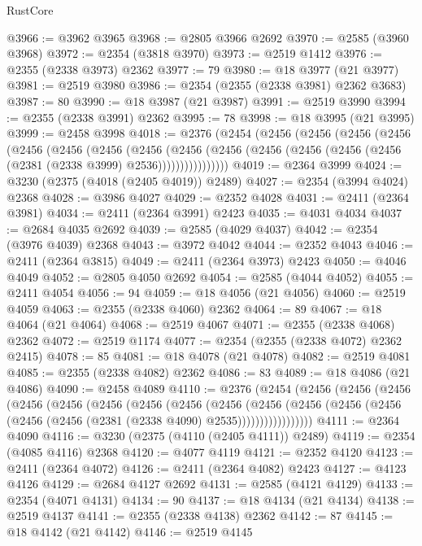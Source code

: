 \begin{lexlean}{RustCore}
\begin{coremodule}
@3966 := @3962 @3965
@3968 := @2805 @3966 @2692
@3970 := @2585 (@3960 @3968)
@3972 := @2354 (@3818 @3970)
@3973 := @2519 @1412
@3976 := @2355 (@2338 @3973) @2362
@3977 := 79
@3980 := @18 @3977 (@21 @3977)
@3981 := @2519 @3980
@3986 := @2354 (@2355 (@2338 @3981) @2362 @3683)
@3987 := 80
@3990 := @18 @3987 (@21 @3987)
@3991 := @2519 @3990
@3994 := @2355 (@2338 @3991) @2362
@3995 := 78
@3998 := @18 @3995 (@21 @3995)
@3999 := @2458 @3998
@4018 := @2376
    (@2454
      (@2456
        (@2456
          (@2456
            (@2456
              (@2456
                (@2456
                  (@2456
                    (@2456
                      (@2456
                        (@2456
                          (@2456 (@2456 (@2456 (@2456 (@2381 (@2338 @3999) @2536))))))))))))))))
@4019 := @2364 @3999
@4024 := @3230 (@2375 (@4018 (@2405 @4019)) @2489)
@4027 := @2354 (@3994 @4024) @2368
@4028 := @3986 @4027
@4029 := @2352 @4028
@4031 := @2411 (@2364 @3981)
@4034 := @2411 (@2364 @3991) @2423
@4035 := @4031 @4034
@4037 := @2684 @4035 @2692
@4039 := @2585 (@4029 @4037)
@4042 := @2354 (@3976 @4039) @2368
@4043 := @3972 @4042
@4044 := @2352 @4043
@4046 := @2411 (@2364 @3815)
@4049 := @2411 (@2364 @3973) @2423
@4050 := @4046 @4049
@4052 := @2805 @4050 @2692
@4054 := @2585 (@4044 @4052)
@4055 := @2411 @4054
@4056 := 94
@4059 := @18 @4056 (@21 @4056)
@4060 := @2519 @4059
@4063 := @2355 (@2338 @4060) @2362
@4064 := 89
@4067 := @18 @4064 (@21 @4064)
@4068 := @2519 @4067
@4071 := @2355 (@2338 @4068) @2362
@4072 := @2519 @1174
@4077 := @2354 (@2355 (@2338 @4072) @2362 @2415)
@4078 := 85
@4081 := @18 @4078 (@21 @4078)
@4082 := @2519 @4081
@4085 := @2355 (@2338 @4082) @2362
@4086 := 83
@4089 := @18 @4086 (@21 @4086)
@4090 := @2458 @4089
@4110 := @2376
    (@2454
      (@2456
        (@2456
          (@2456
            (@2456
              (@2456
                (@2456
                  (@2456
                    (@2456
                      (@2456
                        (@2456
                          (@2456
                            (@2456 (@2456 (@2456 (@2456 (@2381 (@2338 @4090) @2535)))))))))))))))))
@4111 := @2364 @4090
@4116 := @3230 (@2375 (@4110 (@2405 @4111)) @2489)
@4119 := @2354 (@4085 @4116) @2368
@4120 := @4077 @4119
@4121 := @2352 @4120
@4123 := @2411 (@2364 @4072)
@4126 := @2411 (@2364 @4082) @2423
@4127 := @4123 @4126
@4129 := @2684 @4127 @2692
@4131 := @2585 (@4121 @4129)
@4133 := @2354 (@4071 @4131)
@4134 := 90
@4137 := @18 @4134 (@21 @4134)
@4138 := @2519 @4137
@4141 := @2355 (@2338 @4138) @2362
@4142 := 87
@4145 := @18 @4142 (@21 @4142)
@4146 := @2519 @4145

\end{coremodule}
\end{lexlean}
